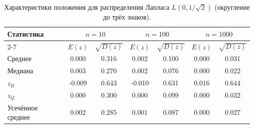\begin{table}[H]
\centering
\small
\begin{tabular}{|l|cc|cc|cc|}
\hline
\multirow{2}{*}{Статистика} & \multicolumn{2}{c|}{$n=10$} & \multicolumn{2}{c|}{$n=100$} & \multicolumn{2}{c|}{$n=1000$} \\
\cline{2-7}
 & $E(z)$ & $\sqrt{D(z)}$ & $E(z)$ & $\sqrt{D(z)}$ & $E(z)$ & $\sqrt{D(z)}$ \\
\hline
Среднее & 0.000 & 0.316 & 0.002 & 0.100 & 0.000 & 0.031 \\
\hline
Медиана & 0.003 & 0.270 & 0.002 & 0.076 & 0.000 & 0.022 \\
\hline
$z_R$ & -0.009 & 0.643 & -0.010 & 0.631 & 0.016 & 0.644 \\
\hline
$z_Q$ & 0.000 & 0.300 & 0.000 & 0.099 & 0.000 & 0.032 \\
\hline
Усечённое среднее & 0.002 & 0.285 & 0.001 & 0.087 & 0.000 & 0.027 \\
\hline
\end{tabular}
\caption{Характеристики положения для распределения Лапласа $L(0, 1/\sqrt{2})$ (округление до трёх знаков).}
\label{tab:laplace_rounded}
\end{table}